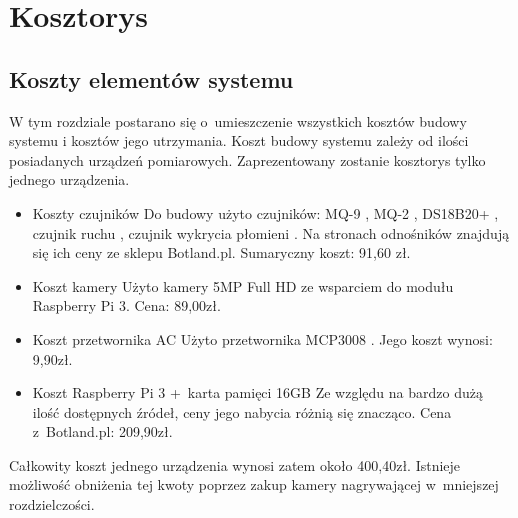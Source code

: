 \chapter{Kosztorys}

\section{Koszty elementów systemu}
W tym rozdziale postarano się o~umieszczenie wszystkich kosztów budowy systemu i kosztów jego utrzymania. Koszt budowy systemu zależy od ilości posiadanych urządzeń pomiarowych. Zaprezentowany zostanie kosztorys tylko jednego urządzenia.
\begin{itemize}
\item Koszty czujników \newline
Do budowy użyto czujników: MQ-9 \cite{specyfikacjaMQ-9}, MQ-2 \cite{specyfikacjaMQ-2}, DS18B20+ \cite{specyfikacjaTemp}, czujnik ruchu \cite{pir}, czujnik wykrycia płomieni \cite {specyfikacjaFlame}. Na stronach odnośników znajdują się ich ceny ze sklepu Botland.pl. Sumaryczny koszt: 91,60 zł.
\item Koszt kamery \newline
Użyto kamery 5MP Full HD ze wsparciem do modułu Raspberry Pi 3. Cena: 89,00zł.
\item Koszt przetwornika AC \newline
Użyto przetwornika MCP3008 \cite{specyfikacjaAC}. Jego koszt wynosi: 9,90zł.
\item Koszt Raspberry Pi 3 +~karta pamięci 16GB \newline
Ze względu na bardzo dużą ilość dostępnych źródeł, ceny jego nabycia różnią się znacząco. Cena z~Botland.pl: 209,90zł.
\end{itemize}
Całkowity koszt jednego urządzenia wynosi zatem około 400,40zł. Istnieje możliwość obniżenia tej kwoty poprzez zakup kamery nagrywającej w~mniejszej rozdzielczości. 


